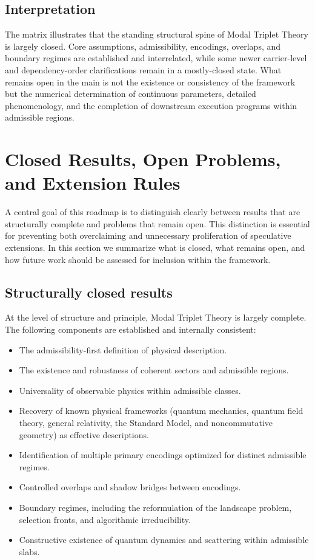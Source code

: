 \documentclass[11pt]{article}
\begin{document}
\subsection{Interpretation}

The matrix illustrates that the standing structural spine of Modal Triplet Theory is largely closed. Core assumptions, admissibility, encodings, overlaps, and boundary regimes are established and interrelated, while some newer carrier-level and dependency-order clarifications remain in a mostly-closed state. What remains open in the main is not the existence or consistency of the framework but the numerical determination of continuous parameters, detailed phenomenology, and the completion of downstream execution programs within admissible regions.
\section{Closed Results, Open Problems, and Extension Rules}

A central goal of this roadmap is to distinguish clearly between results that are structurally complete and problems that remain open. This distinction is essential for preventing both overclaiming and unnecessary proliferation of speculative extensions. In this section we summarize what is closed, what remains open, and how future work should be assessed for inclusion within the framework.

\subsection{Structurally closed results}

At the level of structure and principle, Modal Triplet Theory is largely complete. The following components are established and internally consistent:

\begin{itemize}
\item The admissibility-first definition of physical description.
\item The existence and robustness of coherent sectors and admissible regions.
\item Universality of observable physics within admissible classes.
\item Recovery of known physical frameworks (quantum mechanics, quantum field theory, general relativity, the Standard Model, and noncommutative geometry) as effective descriptions.
\item Identification of multiple primary encodings optimized for distinct admissible regimes.
\item Controlled overlaps and shadow bridges between encodings.
\item Boundary regimes, including the reformulation of the landscape problem, selection fronts, and algorithmic irreducibility.
\item Constructive existence of quantum dynamics and scattering within admissible slabs.
\end{itemize}
\end{document}
